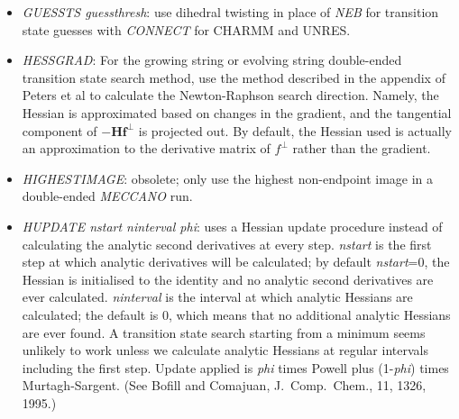 \documentclass[12pt,a4paper,dvips]{article}
\begin{document}
\begin{itemize}
\item {\it GUESSTS guessthresh\/}: use dihedral twisting in place of {\it NEB\/} for 
transition state guesses with {\it CONNECT\/} for CHARMM and UNRES.

\item {\it HESSGRAD\/}: For the growing string or evolving string double-ended
  transition state search method, use the method described in the appendix of
  Peters et al\cite{PetersHBC04} to calculate the Newton-Raphson search
  direction. Namely, the Hessian is approximated based on changes in the
  gradient, and the tangential component of $-\mathbf{Hf^\perp}$ is projected
  out. By default, the Hessian used is actually an approximation to the
  derivative matrix of $f^\perp$ rather than the gradient.

\item {\it HIGHESTIMAGE\/}: obsolete; 
only use the highest non-endpoint image in a double-ended {\it MECCANO\/} run.

\item {\it HUPDATE nstart ninterval phi\/}: uses a Hessian update 
procedure instead
of calculating the analytic second derivatives at every step. 
{\it nstart\/} is the first step at which analytic derivatives will be calculated; by
default {\it nstart\/}=0, the Hessian is initialised to the identity and no
analytic second derivatives are ever calculated. {\it ninterval\/} is the interval
at which analytic Hessians are calculated; the default is 0, which means that no
additional analytic Hessians are ever found. A transition state search starting from
a minimum seems unlikely to work unless we calculate analytic Hessians at regular
intervals including the first step. Update applied is
{\it phi\/} times Powell\cite{powell71} plus (1-{\it phi}) times Murtagh-Sargent.
(See Bofill and Comajuan, J.~Comp.~Chem., 11, 1326, 1995.)



\end{itemize}
\end{document}
